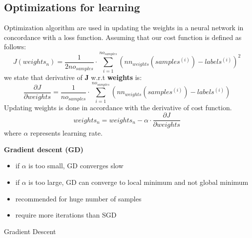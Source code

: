 \subsection{Optimizations for learning}
Optimization algorithm are used in updating the weights in a neural network in concordance with a loss function.
\label{optimization}
Assuming that our cost function is defined as follows\cite{ng}:
\begin{equation}
	J(weights_n) = \frac{1}{2no_{samples}}\cdot\displaystyle\sum_{i=1}^{no_{samples}}(nn_{weights}(samples^{(i)}) - labels^{(i)})^2
\end{equation}
we state that derivative of \textbf{J} w.r.t \textbf{weights} is\cite{ng}:
\begin{equation}
	\frac{\partial J}{\partial weights} = \frac{1}{no_{samples}}\cdot\displaystyle\sum_{i=1}^{no_{samples}}(nn_{weights}(samples^{(i)}) - labels^{(i)})
\end{equation}
Updating weights\cite{ng} is done in accordance with the derivative of cost function.
\begin{equation}
	weights_n = weights_n - \alpha\cdot\frac{\partial J}{\partial weights}
\end{equation}
where $\alpha$ represents learning rate.

\newpage
\textbf{Gradient descent (GD)}

\begin{itemize}
	\item{if $\alpha$ is too small, GD converges slow}
	\item{if $\alpha$ is too large, GD can converge to local minimum and not global minimum}
	\item{recommended for huge number of samples}
	\item{require more iterations than SGD}
\end{itemize}

\begin{algorithm}
	\caption{Gradient Descent\cite{ng}} \label{gd-code}
	\begin{algorithmic}[1]
		\Repeat
      			\EndFor
	\end{algorithmic}
\end{algorithm}


